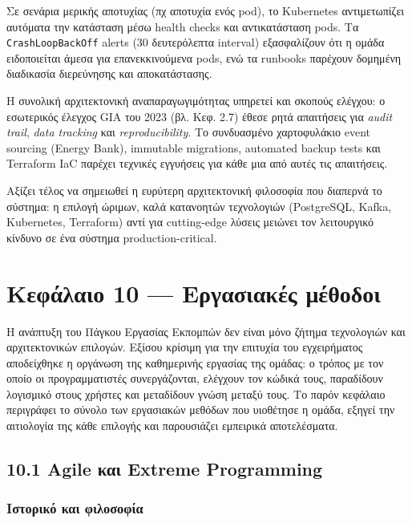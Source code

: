 Σε σενάρια μερικής αποτυχίας (πχ αποτυχία ενός pod), το Kubernetes
αντιμετωπίζει αυτόματα την κατάσταση μέσω health checks και
αντικατάσταση pods. Τα \texttt{CrashLoopBackOff} alerts (30 δευτερόλεπτα
interval) εξασφαλίζουν ότι η ομάδα ειδοποιείται άμεσα για
επανεκκινούμενα pods, ενώ τα runbooks παρέχουν δομημένη διαδικασία
διερεύνησης και αποκατάστασης.

Η συνολική αρχιτεκτονική αναπαραγωγιμότητας υπηρετεί και σκοπούς
ελέγχου: ο εσωτερικός έλεγχος GIA του 2023 (βλ. Κεφ. 2.7) έθεσε ρητά
απαιτήσεις για \emph{audit trail}, \emph{data tracking} και
\emph{reproducibility}. Το συνδυασμένο χαρτοφυλάκιο event sourcing
(Energy Bank), immutable migrations, automated backup tests και
Terraform IaC παρέχει τεχνικές εγγυήσεις για κάθε μια από αυτές τις
απαιτήσεις.

Αξίζει τέλος να σημειωθεί η ευρύτερη αρχιτεκτονική φιλοσοφία που
διαπερνά το σύστημα: η επιλογή ώριμων, καλά κατανοητών τεχνολογιών
(PostgreSQL, Kafka, Kubernetes, Terraform) αντί για cutting-edge λύσεις
μειώνει τον λειτουργικό κίνδυνο σε ένα σύστημα production-critical.

\pagebreak

\chapter{Κεφάλαιο 10 --- Εργασιακές
μέθοδοι}\label{ux3baux3b5ux3c6ux3acux3bbux3b1ux3b9ux3bf-10-ux3b5ux3c1ux3b3ux3b1ux3c3ux3b9ux3b1ux3baux3adux3c2-ux3bcux3adux3b8ux3bfux3b4ux3bfux3b9}

Η ανάπτυξη του Πάγκου Εργασίας Εκπομπών δεν είναι μόνο ζήτημα
τεχνολογιών και αρχιτεκτονικών επιλογών. Εξίσου κρίσιμη για την επιτυχία
του εγχειρήματος αποδείχθηκε η οργάνωση της καθημερινής εργασίας της
ομάδας: ο τρόπος με τον οποίο οι προγραμματιστές συνεργάζονται, ελέγχουν
τον κώδικά τους, παραδίδουν λογισμικό στους χρήστες και μεταδίδουν γνώση
μεταξύ τους. Το παρόν κεφάλαιο περιγράφει το σύνολο των εργασιακών
μεθόδων που υιοθέτησε η ομάδα, εξηγεί την αιτιολογία της κάθε επιλογής
και παρουσιάζει εμπειρικά αποτελέσματα.

\section{10.1 Agile και Extreme
Programming}\label{agile-ux3baux3b1ux3b9-extreme-programming}

\subsection{Ιστορικό και
φιλοσοφία}\label{ux3b9ux3c3ux3c4ux3bfux3c1ux3b9ux3baux3cc-ux3baux3b1ux3b9-ux3c6ux3b9ux3bbux3bfux3c3ux3bfux3c6ux3afux3b1}

